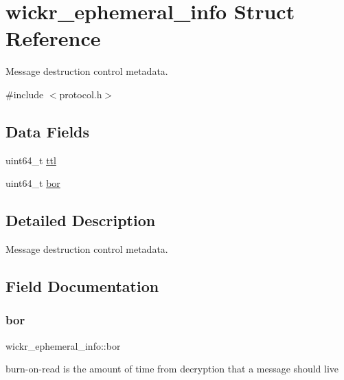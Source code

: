 \hypertarget{structwickr__ephemeral__info}{}\section{wickr\+\_\+ephemeral\+\_\+info Struct Reference}
\label{structwickr__ephemeral__info}


Message destruction control metadata.  




{\ttfamily \#include $<$protocol.\+h$>$}

\subsection*{Data Fields}
\begin{DoxyCompactItemize}
\item 
uint64\+\_\+t \hyperlink{structwickr__ephemeral__info_ac7936b5b7b83dd24ab6b68e8dd2dd6ba}{ttl}
\item 
uint64\+\_\+t \hyperlink{structwickr__ephemeral__info_a0bfb5badb8bdcfac1ace1ef2026c86ac}{bor}
\end{DoxyCompactItemize}


\subsection{Detailed Description}
Message destruction control metadata. 

\subsection{Field Documentation}
\mbox{\label{structwickr__ephemeral__info_a0bfb5badb8bdcfac1ace1ef2026c86ac}} 
\subsubsection{\texorpdfstring{bor}{bor}}
{\footnotesize\ttfamily wickr\+\_\+ephemeral\+\_\+info\+::bor}

burn-\/on-\/read is the amount of time from decryption that a message should live \mbox{\label{structwickr__ephemeral__info_ac7936b5b7b83dd24ab6b68e8dd2dd6ba}} 
